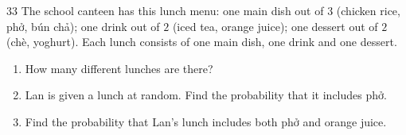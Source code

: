 \documentclass[11pt]{article}
\begin{document}
\begin{probbox}{33}{\relax}
The school canteen has this lunch menu: one main dish out of $3$ (chicken rice, phở, bún chả); one drink out of $2$ (iced tea, orange juice); one dessert out of $2$ (chè, yoghurt). Each lunch consists of one main dish, one drink and one dessert.
\begin{enumerate}[label=\alph*),leftmargin=1.5em,itemsep=0pt,topsep=2pt]
\item How many different lunches are there?
\item Lan is given a lunch at random. Find the probability that it includes phở.
\item Find the probability that Lan's lunch includes both phở and orange juice.
\end{enumerate}
\end{probbox}
\end{document}
